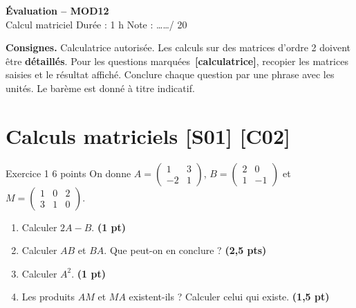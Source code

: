 \documentclass[a4paper,11pt]{article}
\newcommand{\pts}[1]{\hfill{\color{uimmred}\small\textbf{(#1)}}}
\newcommand{\M}[1]{\begin{pmatrix}#1\end{pmatrix}}
\newcommand{\calc}{\,{\color{uimmred}\small\textbf{[calculatrice]}}}
\begin{document}
\begin{tcolorbox}[colback=uimmred, colframe=uimmred, sharp corners, boxrule=0pt,
  left=14pt, right=14pt, top=10pt, bottom=10pt]
{\color{white}\LARGE\bfseries Évaluation -- MOD12}\\[4pt]
{\color{white}\large Calcul matriciel \hfill Durée : 1 h \quad Note : \dots\dots / 20}
\end{tcolorbox}

\vspace{2pt}

\begin{consigne}
\textbf{Consignes.} Calculatrice autorisée. Les calculs sur des matrices d'ordre 2 doivent être \textbf{détaillés}. Pour les questions marquées \calc, recopier les matrices saisies et le résultat affiché. Conclure chaque question par une phrase avec les unités. Le barème est donné à titre indicatif.
\end{consigne}

\needspace{8cm}
\section{Calculs matriciels \hfill {\normalsize\color{uimmred}[S01] [C02]}}
\begin{exo}{Exercice 1 \hfill 6 points}
\label{ev:1}
On donne $A = \M{1 & 3\\ -2 & 1}$, $B = \M{2 & 0\\ 1 & -1}$ et $M = \M{1 & 0 & 2\\ 3 & 1 & 0}$.
\begin{enumerate}
  \item Calculer $2A - B$. \pts{1 pt}
  \item Calculer $AB$ et $BA$. Que peut-on en conclure ? \pts{2,5 pts}
  \item Calculer $A^2$. \pts{1 pt}
  \item Les produits $AM$ et $MA$ existent-ils ? Calculer celui qui existe. \pts{1,5 pt}
\end{enumerate}
\end{exo}
\end{document}
